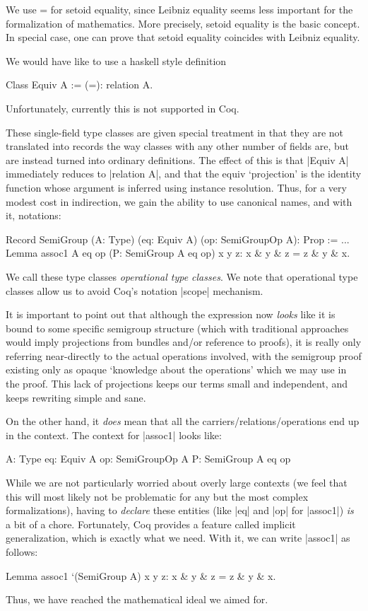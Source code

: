 \documentclass[a4paper,10pt, runningheads]{llncs}
\begin{document}
We use = for setoid equality, since Leibniz equality seems less important for the formalization of
mathematics. More precisely, setoid equality is the basic concept. In special case, one can prove
that setoid equality coincides with Leibniz equality.

We would have like to use a haskell style definition
\begin{code}
Class Equiv A := (=): relation A.
\end{code}
Unfortunately, currently this is not supported in Coq.

These single-field type classes are given special treatment in that they are not translated into
records the way classes with any other number of fields are, but are instead turned into ordinary
definitions. The effect of this is that |Equiv A| immediately reduces to |relation A|, and that the
equiv `projection' is the identity function whose argument is inferred using instance resolution.
Thus, for a very modest cost in indirection, we gain the ability to use canonical names, and with
it, notations:
\begin{code}
  Record SemiGroup (A: Type) (eq: Equiv A)
                             (op: SemiGroupOp A): Prop := ...
  Lemma assoc1 A eq op (P: SemiGroup A eq op) x y z:
                    x & y & z = z & y & x.
\end{code}
We call these type classes \emph{operational type classes}. We note that operational type classes
allow us to avoid Coq's notation |scope| mechanism.

It is important to point out that although the expression now \emph{looks} like it is bound to some
specific semigroup structure (which with traditional approaches would imply projections from bundles
and/or reference to proofs), it is really only referring near-directly to the actual operations
involved, with the semigroup proof existing only as opaque `knowledge about the operations' which we
may use in the proof. This lack of projections keeps our terms small and independent, and keeps
rewriting simple and sane.

On the other hand, it \emph{does} mean that all the carriers/relations/operations end up in the
context. The context for |assoc1| looks like:
\begin{code}
  A: Type
  eq: Equiv A
  op: SemiGroupOp A
  P: SemiGroup A eq op
\end{code}

While we are not particularly worried about overly large contexts (we feel that this will most
likely not be problematic for any but the most complex formalizations), having to \emph{declare}
these entities (like |eq| and |op| for |assoc1|) \emph{is} a bit of a chore. Fortunately, Coq
provides a feature called implicit generalization, which is exactly what we need.
 With it, we can write |assoc1| as follows:
\begin{code}
  Lemma assoc1 `(SemiGroup A) x y z: x & y & z = z & y & x.
\end{code}
Thus, we have reached the mathematical ideal we aimed for.
\end{document}
